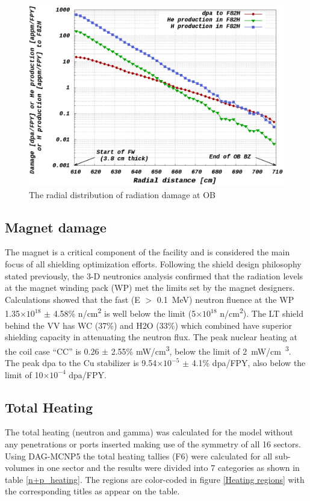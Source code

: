 \documentclass[12pt, letterpaper]{elsarticle}
\begin{document}
\begin{figure}[h!]
  \centering
  \includegraphics[scale=0.2]{../plots/radialdamage.png}
  \caption{The radial distribution of radiation damage at OB}
  \label{fig:Radial Damage}
\end{figure}

\subsection{Magnet damage} \label{Magnet damage}
\providecommand{\e}[1]{\ensuremath{\times 10^{#1}}}
The magnet is a critical component of the facility and is considered the main focus of all shielding optimization efforts. Following the shield design philosophy stated previously, the 3-D neutronics analysis confirmed that the radiation levels at the magnet winding pack (WP) met the limits set by the magnet designers. Calculations showed that the fast (E $>$ \SI{0.1}{MeV}) neutron fluence at the WP 1.35\e{18} $\pm$ 4.58\% n/cm\textsuperscript{2} is well below the limit (5\e{18} n/cm\textsuperscript{2}). The LT shield behind the VV has WC (37\%) and H2O (33\%) which combined have superior shielding capacity in attenuating the neutron flux. The peak nuclear heating at the coil case “CC” is 0.26 $\pm$ 2.55\% mW/cm\textsuperscript{3}, below the limit of \SI{2}{mW/cm\textsuperscript{3}}. The peak dpa to the Cu stabilizer is 9.54\e{-5} $\pm$ 4.1\% dpa/FPY, also below the limit of 10\e{-4} dpa/FPY.

\subsection{Total Heating}
The total heating (neutron and gamma) was calculated for the model without any penetrations or ports inserted making use of the symmetry of all 16 sectors. Using DAG-MCNP5 the total heating tallies (F6) were calculated for all sub-volumes in one sector and the results were divided into 7 categories as shown in table \ref{n+p_heating}. The regions are color-coded in figure \ref{Heating regions} with the corresponding titles as appear on the table. \vspace{5mm}
\end{document}
